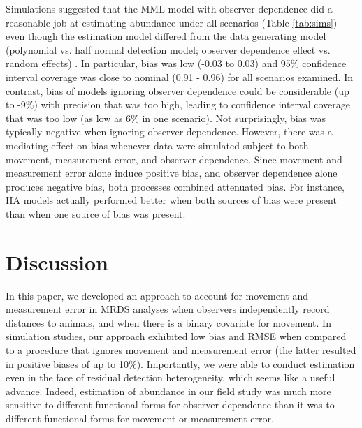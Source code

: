 \documentclass[12pt,fleqn]{article}
\begin{document}
Simulations suggested that the MML model with observer dependence did a reasonable job at estimating abundance under all scenarios (Table \ref{tab:sims}) even though the estimation model differed from the data generating model (polynomial vs. half normal detection model; observer dependence effect vs. random effects) .  In particular, bias was low (-0.03 to 0.03) and 95\% confidence interval coverage was close to nominal (0.91 - 0.96) for all scenarios examined.  In contrast, bias of models ignoring observer dependence could be considerable (up to -9\%) with precision that was too high, leading to confidence interval coverage that was too low (as low as 6\% in one scenario).  Not surprisingly, bias was typically negative when ignoring observer dependence. However, there was a mediating effect on bias whenever data were simulated subject to both movement, measurement error, and observer dependence.  Since movement and measurement error alone induce positive bias, and observer dependence alone produces negative bias, both processes combined attenuated bias. For instance, HA models actually performed better when both sources of bias were present than when one source of bias was present.



\section{Discussion}

In this paper, we developed an approach to account for movement and measurement error in MRDS analyses when observers independently record distances to animals, and when there is a binary covariate for movement. In simulation studies, our approach exhibited low bias and RMSE when compared to a procedure that ignores movement and measurement error (the latter resulted in positive biases of up to 10\%).  Importantly, we were able to conduct estimation even in the face of residual detection heterogeneity, which seems like a useful advance. Indeed, estimation of abundance in our field study was much more sensitive to different functional forms for observer dependence than it was to different functional forms for movement or measurement error.
\end{document}
